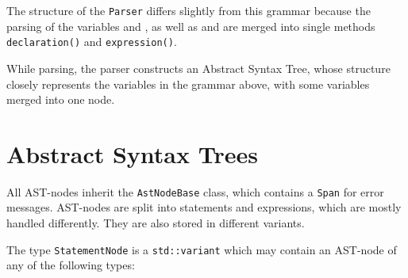 \documentclass[a4paper]{article}
\newcommand*{\code}[1]{\texttt{#1}}
\begin{document}
The structure of the \code{Parser} differs slightly from this grammar 
because the parsing of the variables  and , as well 
as  and  are merged into single 
methods \code{declaration()} and \code{expression()}.

While parsing, the parser constructs an Abstract Syntax Tree, 
whose structure closely represents the variables in the grammar 
above, with some variables merged into one node.

\clearpage
\label{sect:AST}
\section{Abstract Syntax Trees}

All AST-nodes inherit the \code{AstNodeBase} class, which contains 
a \code{Span} for error messages. AST-nodes are split into 
statements and expressions, which are mostly handled differently.
They are also stored in different variants.

The type \code{StatementNode} is a 
\code{std::variant} which may contain an AST-node of any of the 
following types:
\end{document}
